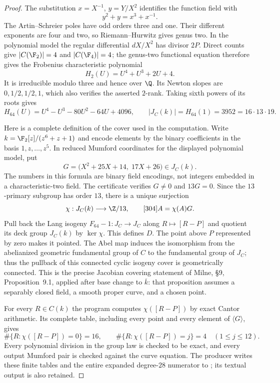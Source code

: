 \begin{proof}
The substitution $x=X^{-1}$, $y=Y/X^2$ identifies the
function field with
\[
 y^2+y=x^3+x^{-1}.
\]
The Artin--Schreier poles have odd orders three and one.
Their different exponents are four and two, so
Riemann--Hurwitz gives genus two. In the polynomial model
the regular differential $dX/X^2$ has divisor $2P$.
Direct counts give $|C(\F_2)|=4$ and $|C(\F_4)|=4$;
the genus-two functional equation therefore gives the
Frobenius characteristic polynomial
\[
 H_2(U)=U^4+U^3+2U+4.
\]
It is irreducible modulo three and hence over $\Q$.
Its Newton slopes are $0,1/2,1/2,1$, which also verifies
the asserted $2$-rank. Taking sixth powers of its roots
gives
\[
 H_{64}(U)=U^4-U^3-80U^2-64U+4096,
 \qquad |J_C(k)|=H_{64}(1)=3952=16\cdot13\cdot19.
\]

Here is a complete definition of the cover used in the
computation. Write $k=\F_2[z]/(z^6+z+1)$ and encode
elements by the binary coefficients in the basis
$1,z,\ldots,z^5$. In reduced Mumford coordinates for the
displayed polynomial model, put
\[
 G=\bigl(X^2+25X+14,\;17X+26\bigr)\in J_C(k).
\]
The numbers in this formula are binary field encodings,
not integers embedded in a characteristic-two field.
The certificate verifies $G\ne0$ and $13G=0$.
Since the $13$-primary subgroup has order $13$, there is
a unique surjection
\[
 \chi:J_C(k)\longrightarrow\Z/13,
 \qquad [304]A=\chi(A)G.
\]
Pull back the Lang isogeny $F_{64}-1:J_C\to J_C$
along $R\mapsto[R-P]$ and quotient its deck group
$J_C(k)$ by $\ker\chi$. This defines $D$. The point
above $P$ represented by zero makes it pointed. The
Abel map induces the isomorphism from the abelianized
geometric fundamental group of $C$ to the fundamental
group of $J_C$; thus the pullback of this connected
cyclic isogeny cover is geometrically connected.
This is the precise Jacobian covering statement of
Milne, \S9, Proposition~9.1, applied after base change
to $\overline{k}$: that proposition assumes a separably
closed field, a smooth proper curve, and a chosen point.
\citep[\S9, Proposition~9.1]{MilneJac}

For every $R\in C(k)$ the program computes
$\chi([R-P])$ by exact Cantor arithmetic. Its complete
table, including every point and every element of
$\langle G\rangle$, gives
\[
 \#\{R:\chi([R-P])=0\}=16,
 \qquad
 \#\{R:\chi([R-P])=j\}=4
 \quad(1\le j\le12).
\]
Every polynomial division in the group law is checked
to be exact, and every output Mumford pair is checked
against the curve equation. The producer
 writes these finite
tables and the entire expanded degree-$28$ numerator to
; its textual
output is also retained.


\end{proof}
